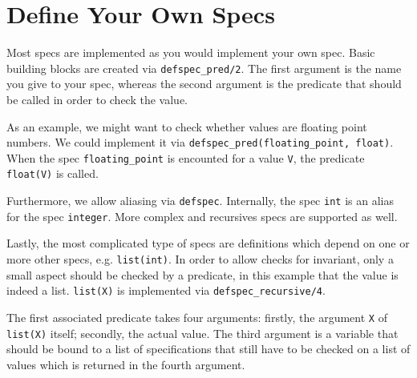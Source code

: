 \documentclass{article}
\begin{document}
\section{Define Your Own Specs}

Most specs are implemented as you would implement your own spec.
Basic building blocks are created via \verb|defspec_pred/2|.
The first argument is the name you give to your spec,
whereas the second argument is the predicate
that should be called in order to check the value.

As an example, we might want to check whether values are floating point numbers.
We could implement it via \verb|defspec_pred(floating_point, float)|.
When the spec \verb|floating_point| is encounted for a value \verb|V|,
the predicate \verb|float(V)| is called.


Furthermore, we allow aliasing via \verb|defspec|.
Internally, the spec \verb|int| is an alias for the spec \verb|integer|.
More complex and recursives specs are supported as well.


Lastly, the most complicated type of specs are
definitions which depend on one or more other specs,
e.g. \verb|list(int)|.
In order to allow checks for invariant,
only a small aspect should be checked by a predicate,
in this example that the value is indeed a list.
\verb|list(X)| is implemented via \verb|defspec_recursive/4|.

The first associated predicate takes four arguments:
firstly, the argument \verb|X| of \verb|list(X)| itself;
secondly, the actual value.
The third argument is a variable that should be bound to a list
of specifications that still have to be checked on
a list of values which is returned in the fourth argument.




%
%
\end{document}
